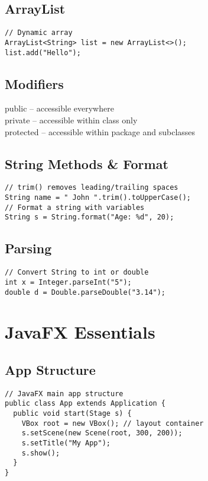 \documentclass[10pt]{article}
\begin{document}
\begin{multicols}{2}
\subsection*{ArrayList}
\begin{lstlisting}
// Dynamic array
ArrayList<String> list = new ArrayList<>();
list.add("Hello");
\end{lstlisting}
\subsection*{Modifiers}
public – accessible everywhere \\
private – accessible within class only \\
protected – accessible within package and subclasses
\subsection*{String Methods \& Format}
\begin{lstlisting}
// trim() removes leading/trailing spaces
String name = " John ".trim().toUpperCase();
// Format a string with variables
String s = String.format("Age: %d", 20);
\end{lstlisting}

\subsection*{Parsing}
\begin{lstlisting}
// Convert String to int or double
int x = Integer.parseInt("5");
double d = Double.parseDouble("3.14");
\end{lstlisting}



\section*{JavaFX Essentials}

\subsection*{App Structure}
\begin{lstlisting}
// JavaFX main app structure
public class App extends Application {
  public void start(Stage s) {
    VBox root = new VBox(); // layout container
    s.setScene(new Scene(root, 300, 200));
    s.setTitle("My App");
    s.show();
  }
}
\end{lstlisting}


\end{multicols}
\end{document}
